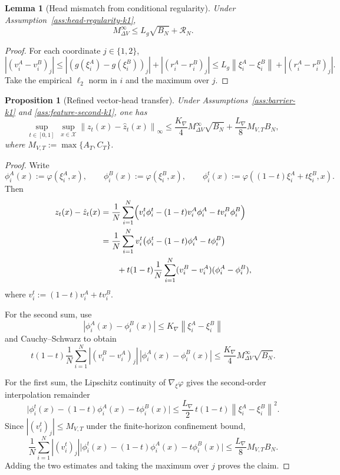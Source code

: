 \documentclass[11pt]{article}
\newtheorem{proposition}[theorem]{Proposition}
\newtheorem{lemma}[theorem]{Lemma}
\theoremstyle{definition}
\newcommand{\norm}[1]{\left\lVert #1 \right\rVert}
\newcommand{\mc}[1]{\mathcal{#1}}
\begin{document}
\begin{lemma}[Head mismatch from conditional regularity]
\label{lem:head-mismatch-regular-k1}
Under Assumption~\ref{ass:head-regularity-k1},
\begin{equation}
  M_{\Delta V}^\infty
  \le
  L_g\sqrt{B_N}+\mc{R}_N.
  \label{eq:head-mismatch-regular-k1}
\end{equation}
\end{lemma}

\begin{proof}
For each coordinate $j\in\{1,2\}$,
\[
  |(v_i^A-v_i^B)_j|
  \le
  |(g(\xi_i^A)-g(\xi_i^B))_j|
  +
  |(r_i^A-r_i^B)_j|
  \le
  L_g\norm{\xi_i^A-\xi_i^B}+|(r_i^A-r_i^B)_j|.
\]
Take the empirical $\ell_2$ norm in $i$ and the maximum over $j$.
\end{proof}

\begin{proposition}[Refined vector-head transfer]
\label{prop:refined-transfer-k1}
Under Assumptions~\ref{ass:barrier-k1} and \ref{ass:feature-second-k1}, one has
\begin{equation}
  \sup_{t\in[0,1]}\ \sup_{x\in\mc{X}}
  \norm{z_t(x)-\hat z_t(x)}_\infty
  \le
  \frac{K_{\nabla}}{4}M_{\Delta V}^\infty\sqrt{B_N}
  +
  \frac{L_{\nabla}}{8}M_{V,T}B_N,
  \label{eq:refined-transfer-k1}
\end{equation}
where $M_{V,T}:=\max\{A_T,C_T\}$.
\end{proposition}

\begin{proof}
Write
\[
  \phi_i^A(x):=\varphi(\xi_i^A,x),
  \qquad
  \phi_i^B(x):=\varphi(\xi_i^B,x),
  \qquad
  \phi_i^t(x):=\varphi((1-t)\xi_i^A+t\xi_i^B,x).
\]
Then
\begin{align*}
  z_t(x)-\hat z_t(x)
  &=
  \frac1N\sum_{i=1}^N
  \Bigl(
    v_i^t\phi_i^t-(1-t)v_i^A\phi_i^A-tv_i^B\phi_i^B
  \Bigr)
  \\
  &=
  \frac1N\sum_{i=1}^N
  v_i^t\bigl(\phi_i^t-(1-t)\phi_i^A-t\phi_i^B\bigr)
  \\
  &\qquad
  +
  t(1-t)\frac1N\sum_{i=1}^N
  (v_i^B-v_i^A)(\phi_i^A-\phi_i^B),
\end{align*}
where $v_i^t:=(1-t)v_i^A+tv_i^B$.

For the second sum, use
\[
  |\phi_i^A(x)-\phi_i^B(x)|
  \le
  K_{\nabla}\norm{\xi_i^A-\xi_i^B}
\]
and Cauchy--Schwarz to obtain
\[
  t(1-t)\frac1N\sum_{i=1}^N
  |(v_i^B-v_i^A)_j|\,|\phi_i^A(x)-\phi_i^B(x)|
  \le
  \frac{K_{\nabla}}{4}M_{\Delta V}^\infty\sqrt{B_N}.
\]

For the first sum, the Lipschitz continuity of $\nabla_\xi\varphi$ gives the
second-order interpolation remainder
\[
  \bigl|
    \phi_i^t(x)-(1-t)\phi_i^A(x)-t\phi_i^B(x)
  \bigr|
  \le
  \frac{L_{\nabla}}{2}\,t(1-t)\norm{\xi_i^A-\xi_i^B}^2.
\]
Since $|(v_i^t)_j|\le M_{V,T}$ under the finite-horizon confinement bound,
\[
  \frac1N\sum_{i=1}^N
  |(v_i^t)_j|
  \bigl|
    \phi_i^t(x)-(1-t)\phi_i^A(x)-t\phi_i^B(x)
  \bigr|
  \le
  \frac{L_{\nabla}}{8}M_{V,T}B_N.
\]
Adding the two estimates and taking the maximum over $j$ proves the claim.
\end{proof}
\end{document}
